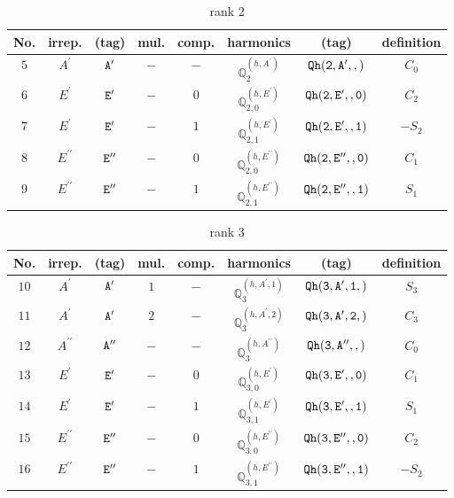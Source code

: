 \documentclass[fleqn,8pt]{jsarticle}
\begin{document}
\begin{table}[ht!]
\begin{center}
\caption{rank 2}
\renewcommand{\arraystretch}{1.3}
\begin{tabular}{cccccccc} \hline \hline
No. & irrep. & (tag) & mul. & comp. & harmonics & (tag) & definition \\ \hline
$ 5 $ & $ A^{\prime} $ & $ {\tt A'} $ & $ - $ & $ - $ & $ \mathbb{Q}_{2}^{(h,A^{\prime})} $ & $ {\tt Qh(2,A',,)} $ & $ C_{0} $ \\
$ 6 $ & $ E^{\prime} $ & $ {\tt E'} $ & $ - $ & $ 0 $ & $ \mathbb{Q}_{2,0}^{(h,E^{\prime})} $ & $ {\tt Qh(2,E',,0)} $ & $ C_{2} $ \\
$ 7 $ & $ E^{\prime} $ & $ {\tt E'} $ & $ - $ & $ 1 $ & $ \mathbb{Q}_{2,1}^{(h,E^{\prime})} $ & $ {\tt Qh(2,E',,1)} $ & $ - S_{2} $ \\
$ 8 $ & $ E^{\prime\prime} $ & $ {\tt E''} $ & $ - $ & $ 0 $ & $ \mathbb{Q}_{2,0}^{(h,E^{\prime\prime})} $ & $ {\tt Qh(2,E'',,0)} $ & $ C_{1} $ \\
$ 9 $ & $ E^{\prime\prime} $ & $ {\tt E''} $ & $ - $ & $ 1 $ & $ \mathbb{Q}_{2,1}^{(h,E^{\prime\prime})} $ & $ {\tt Qh(2,E'',,1)} $ & $ S_{1} $ \\
 \hline \hline
\end{tabular}
\end{center}
\end{table}
\begin{table}[ht!]
\begin{center}
\caption{rank 3}
\renewcommand{\arraystretch}{1.3}
\begin{tabular}{cccccccc} \hline \hline
No. & irrep. & (tag) & mul. & comp. & harmonics & (tag) & definition \\ \hline
$ 10 $ & $ A^{\prime} $ & $ {\tt A'} $ & $ 1 $ & $ - $ & $ \mathbb{Q}_{3}^{(h,A^{\prime},1)} $ & $ {\tt Qh(3,A',1,)} $ & $ S_{3} $ \\
$ 11 $ & $ A^{\prime} $ & $ {\tt A'} $ & $ 2 $ & $ - $ & $ \mathbb{Q}_{3}^{(h,A^{\prime},2)} $ & $ {\tt Qh(3,A',2,)} $ & $ C_{3} $ \\
$ 12 $ & $ A^{\prime\prime} $ & $ {\tt A''} $ & $ - $ & $ - $ & $ \mathbb{Q}_{3}^{(h,A^{\prime\prime})} $ & $ {\tt Qh(3,A'',,)} $ & $ C_{0} $ \\
$ 13 $ & $ E^{\prime} $ & $ {\tt E'} $ & $ - $ & $ 0 $ & $ \mathbb{Q}_{3,0}^{(h,E^{\prime})} $ & $ {\tt Qh(3,E',,0)} $ & $ C_{1} $ \\
$ 14 $ & $ E^{\prime} $ & $ {\tt E'} $ & $ - $ & $ 1 $ & $ \mathbb{Q}_{3,1}^{(h,E^{\prime})} $ & $ {\tt Qh(3,E',,1)} $ & $ S_{1} $ \\
$ 15 $ & $ E^{\prime\prime} $ & $ {\tt E''} $ & $ - $ & $ 0 $ & $ \mathbb{Q}_{3,0}^{(h,E^{\prime\prime})} $ & $ {\tt Qh(3,E'',,0)} $ & $ C_{2} $ \\
$ 16 $ & $ E^{\prime\prime} $ & $ {\tt E''} $ & $ - $ & $ 1 $ & $ \mathbb{Q}_{3,1}^{(h,E^{\prime\prime})} $ & $ {\tt Qh(3,E'',,1)} $ & $ - S_{2} $ \\
 \hline \hline
\end{tabular}
\end{center}
\end{table}
\end{document}
